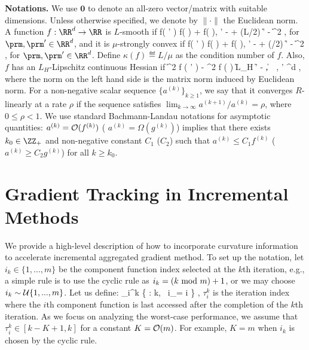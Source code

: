 \documentclass[smallextended]{svjour3}       %
\begin{document}
\vspace{.2cm}
\noindent \textbf{Notations.}
We use ${\bm 0}$ to denote an all-zero vector/matrix with suitable dimensions. 
Unless otherwise specified, we denote by $\| \cdot \|$ the Euclidean norm. 
A function $f : \RR^d \rightarrow \RR$ is $L$-smooth if %
\beq \label{eq:smooth_l}
f( \prm' ) \leq f( \prm ) + \langle \grd f( \prm ), \prm' - \prm \rangle + (L/2) \| \prm' - \prm \|^2 \eqs,
\eeq
for $\prm,\prm' \in \RR^d$,
and 
it is $\mu$-strongly convex if 
\beq \label{eq:strcvx}
f( \prm' ) \geq f( \prm ) + \langle \grd f( \prm ), \prm' - \prm \rangle + (\mu/2) \| \prm' - \prm \|^2 \eqs,
\eeq
for $\prm,\prm' \in \RR^d$.
Define $\kappa(f) \eqdef L / \mu$ as the condition number of $f$. 
Also, $f$ has an $L_H$-Lipschitz continuous Hessian if
\beq
\| \grd^2 f ( \prm' ) - \grd^2 f ( \prm ) \| \leq L_H \| \prm' - \prm \|,~\forall~\prm, \prm' \in \RR^d \eqs,
\eeq
where the norm on the left hand side is the matrix
norm induced by Euclidean norm. 
For a non-negative scalar sequence $\{ a^{(k)} \}_{k \geq 1}$, we say that 
it converges $R$-linearly at a rate $\rho$ if the sequence satisfies 
$\lim_{k \rightarrow \infty} a^{(k+1)} / a^{(k)} = \rho$, where $0 \leq \rho < 1$.
We use standard  Bachmann-Landau notations for 
asymptotic quantities: $a^{(k)} = {\cal O} ( f^{(k)} )$ (\resp 
$a^{(k)} = \Omega( g^{(k)} )$) implies that there exists 
$k_0 \in \ZZ_+$ and 
non-negative constant $C_1$ (\resp $C_2$) such that $a^{(k)} \leq C_1 f^{(k)}$
(\resp $a^{(k)} \geq C_2 g^{(k)}$) for all $k \geq k_0$. 
 
\section{Gradient Tracking in Incremental Methods} \label{sec:back}
We provide a high-level description of how to incorporate curvature information to accelerate incremental aggregated gradient method.
To set up the notation, let $i_k \in \{1,...,m\}$ be the component function index 
selected at the $k$th iteration, e.g., a simple rule is to use the cyclic rule as
 $i_k = (k~{\rm mod}~m)+1$, or  we may choose 
$i_k \sim {\cal U}\{1,...,m\}$. Let us define: 
\beq \label{eq:delay}
\tau_i^k \eqdef \max \{ \tau : \tau \leq k,~ i_\tau = i \} \eqs,
\eeq
\ie $\tau_i^k$ is the iteration index where the $i$th component function is last 
accessed after the completion of the $k$th iteration. 
As we focus  on analyzing the worst-case performance, we assume
that $\tau_i^k \in [k-K+1,k]$ for a constant $K = {\cal O}(m)$. 
For example, $K=m$ when $i_k$ is chosen 
by the cyclic rule.  
\end{document}

